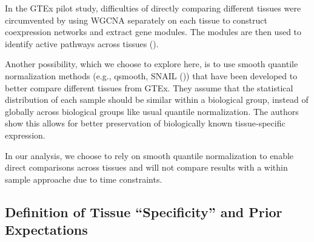 \documentclass{article}
\begin{document}
In the GTEx pilot study, difficulties of directly comparing different tissues were circumvented by using WGCNA separately on each tissue to construct coexpression networks and extract gene modules. The modules are then used to identify active pathways across tissues (\cite{GTEx-Consortium2015-te}).


Another possibility, which we choose to explore here, is to use smooth quantile normalization methods (e.g., qsmooth, SNAIL (\cite{Hicks2018-gi,Hsieh2023-jf})) that have been developed to better compare different tissues from GTEx. They assume that the statistical distribution of each sample should be similar within a biological group, instead of globally across biological groups like usual quantile normalization. The authors show this allows for better preservation of biologically known tissue-specific expression.


In our analysis, we choose to rely on smooth quantile normalization to enable direct comparisons across tissues and will not compare results with a within sample approache due to time constraints.

\subsection{Definition of Tissue “Specificity” and Prior Expectations}
\end{document}
